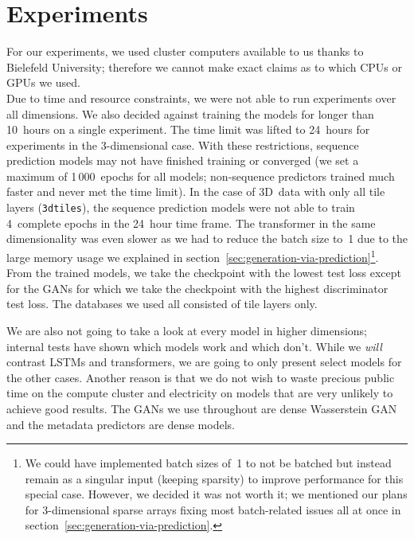 \section{Experiments}

For our experiments, we used cluster computers available to us thanks
to Bielefeld University; therefore we cannot make exact claims as to
which CPUs or GPUs we used. \\
Due to time and resource constraints, we were not able to run
experiments over all dimensions. We also decided against training the
models for longer than 10~hours on a single experiment. The time limit
was lifted to 24~hours for experiments in the 3-dimensional case. With
these restrictions, sequence prediction models may not have finished
training or converged (we set a maximum of 1\,000~epochs for all
models; non-sequence predictors trained much faster and never met the
time limit). In the case of 3D~data with only all tile layers
(\texttt{3dtiles}), the sequence prediction models were not able to
train 4~complete epochs in the 24~hour time frame. The transformer in
the same dimensionality was even slower as we had to reduce the batch
size to~1 due to the large memory usage we explained in
section~\ref{sec:generation-via-prediction}\footnote{We could have
  implemented batch sizes of~1 to not be batched but instead remain as
  a singular input (keeping sparsity) to improve performance for this
  special case. However, we decided it was not worth it; we mentioned
  our plans for 3-dimensional sparse arrays fixing most batch-related
  issues all at once in section~\ref{sec:generation-via-prediction}.}.
From the trained models, we take the checkpoint with the lowest test
loss except for the GANs for which we take the checkpoint with the
highest discriminator test loss. The databases we used all consisted
of tile layers only.

We are also not going to take a look at every model in higher
dimensions; internal tests have shown which models work and which
don't. While we \emph{will} contrast LSTMs and transformers, we are
going to only present select models for the other cases. Another
reason is that we do not wish to waste precious public time on the
compute cluster and electricity on models that are very unlikely to
achieve good results. The GANs we use throughout are dense Wasserstein
GAN and the metadata predictors are dense models.

